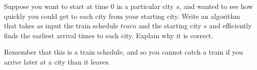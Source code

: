 \documentclass[11pt]{article}
\begin{document}
Suppose you want to start at time $0$ in a particular city $s$, and wanted to see how quickly you could get to 
each city from your starting city. Write an algorithm that takes as input the train schedule $train$ and the starting city $s$ and efficiently finds the earliest arrival times to each city. Explain why it is correct.

Remember that this is a train schedule, and so you cannot catch a train if you arrive later at a city 
than it leaves.
\end{document}
